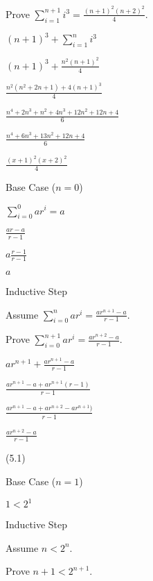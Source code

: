 \documentclass{exam}
\begin{document}
\begin{questions}
\begin{subparts}
\begin{center}
Prove \(  \sum_{i=1}^{n+1} i^3 = \frac{(n+1)^2(n+2)^2}{4} \).

\( (n+1)^3 + \sum_{i=1}^{n} i^3 \)

\( (n+1)^3 + \frac{n^2(n+1)^2}{4} \)

\(  \frac{n^2(n^2+2n+1) + 4(n+1)^3}{4} \)

\(  \frac{n^4+2n^3+n^2+4n^3+12n^2+12n+4}{6} \)

\(  \frac{n^4+6n^3+13n^2+12n+4}{6} \)

\(  \frac{(x+1)^2(x+2)^2}{4} \)

\end{center}



\begin{center}

Base Case (\(n = 0\))

\(\sum_{i=0}^{0} ar^i = a\)

\(\frac{ar - a}{r-1}\)

\(a\frac{r-1}{r-1}\)

\(a\)
\vspace{5px}

Inductive Step

Assume \( \sum_{i=0}^{n} ar^i = \frac{ar^{n+1} - a}{r-1} \). 

Prove \( \sum_{i=0}^{n+1} ar^i = \frac{ar^{n+2} - a}{r-1} \).

\( ar^{n+1} + \frac{ar^{n+1} - a}{r-1} \)

\( \frac{ar^{n+1} - a + ar^{n+1}(r-1) }{r-1} \)

\( \frac{ar^{n+1} - a + ar^{n+2} -  ar^{n+1}) }{r-1} \)

\( \frac{ar^{n+2} - a }{r-1} \)


\end{center}

\end{subparts}

 (5.1)

\begin{center}
Base Case (\(n = 1\))

\( 1 < 2^1 \)

\vspace{5px}

Inductive Step

Assume \( n < 2^n \). 

Prove \( n+1 < 2^{n+1} \).


\end{center}
\end{questions}
\end{document}
